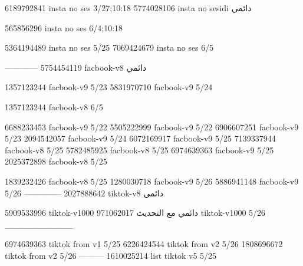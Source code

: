 
6189792841 insta no ses
3/27;10:18
5774028106 insta no sesidi
دائمي


565856296 insta no ses
6/4;10:18


5364194489 insta no ses
5/25
7069424679 insta no ses
6/5

------------
5754454119 facbook-v8
دائمي


1357123244 facbook-v9
5/23
5831970710 facbook-v9
5/24

1357123244 facbook-v8
6/5

6688233453 facbook-v9
5/22
5505222999 facbook-v9
5/22
6906607251 facbook-v9
5/23
2094542057 facbook-v9
5/24
6072169917 facbook-v9
5/25
7139337944 facbook-v8
5/25
5782485925 facbook-v8
5/25
6974639363 facbook-v9
5/25
2025372898 facbook-v8
5/25

1839232426 facbook-v8
5/25
1280030718 facbook-v9
5/26
5886941148 facbook-v9
5/26
--------------
2027888642 tiktok-v8
دائمي

5909533996 tiktok-v1000
دائمي مع التحديث
971062017 tiktok-v1000
5/26
___________

6974639363 tiktok from v1
5/25
6226424544 tiktok from v2
5/26
1808696672 tiktok from v2
5/26
---------
1610025214 list tiktok v5
5/25
